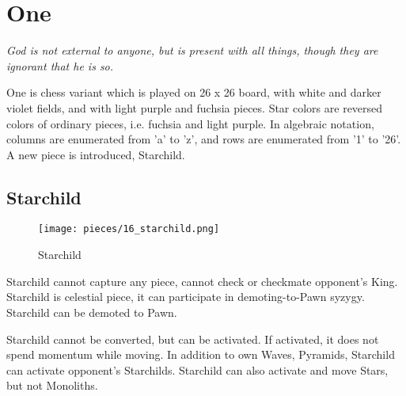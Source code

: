 

\chapter*{One}

\begin{flushright}
\parbox{0.8\textwidth}{
\emph{God is not external to anyone, but is present with all things, though
they are ignorant that he is so. \\
 } }
\end{flushright}

\noindent
One is chess variant which is played on 26 x 26 board, with white and
darker violet fields, and with light purple and fuchsia pieces. Star
colors are reversed colors of ordinary pieces, i.e. fuchsia and light
purple. In algebraic notation, columns are enumerated from 'a' to 'z',
and rows are enumerated from '1' to '26'. A new piece is introduced,
Starchild.

\clearpage %

\section*{Starchild}

\noindent
\begin{wrapfigure}[11]{l}{0.4\textwidth}
\centering
\texttt{[image: pieces/16\_starchild.png]}
\caption{Starchild}
\label{fig:16_starchild}
\end{wrapfigure}
Starchild cannot capture any piece, cannot check or checkmate opponent's King.
Starchild is celestial piece, it can participate in demoting-to-Pawn syzygy.
Starchild can be demoted to Pawn.

Starchild cannot be converted, but can be activated. If activated, it does not spend
momentum while moving. In addition to own Waves, Pyramids, Starchild can activate
opponent's Starchilds. Starchild can also activate and move Stars, but not Monoliths.

